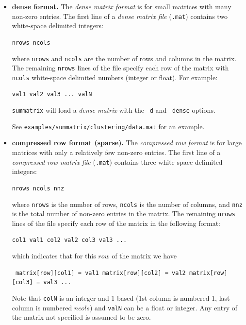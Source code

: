 \documentclass[12pt]{article}
\newcommand{\code}[1]{{\tt #1}}
\newcommand{\codeblock}[1]{\vspace{.1in} {\tt #1} \vspace{.1in}}
\begin{document}
\begin{itemize}

    \item {\bf dense format.}
    The {\em dense matrix format} is for small matrices with many non-zero entries.
    The first line of a {\em dense matrix file} (\code{*.mat})
    contains two white-space delimited integers:
    
    \codeblock{nrows ncols}
    
    where \code{nrows} and \code{ncols} are the number of rows and columns in
    the matrix.  The remaining \code{nrows} lines of
    the file specify each row of the matrix with \code{ncols} white-space
    delimited numbers (integer or float).  For example:

    \codeblock{val1 val2 val3 ... valN}

    \code{summatrix} will load a {\em dense matrix} with the \code{-d}
    and  \code{--dense} options.
    
    See \code{examples/summatrix/clustering/data.mat} for an example.
    
    
    \item {\bf compressed row format (sparse).}
    The {\em compressed row format} is for large matrices with only a
    relatively few non-zero entries.
    The first line of a {\em compressed row matrix file} (\code{*.mat})
    contains three white-space delimited integers:
    
    \codeblock{nrows ncols nnz}
    
    where \code{nrows} is the number of rows, \code{ncols} is the number of
    columns, and \code{nnz} is the total number of non-zero entries in the
    matrix.  The remaining \code{nrows} lines of the file specify each row of
    the matrix in the following format:

    \codeblock{col1 val1 col2 val2 col3 val3 ...}

    which indicates that for this $row$ of the matrix we have
    
    \codeblock{
        matrix[row][col1] = val1 \newline
        matrix[row][col2] = val2 \newline
        matrix[row][col3] = val3 \newline
        ... 
    }
    
    
    Note that \code{colN} is an integer and 1-based (1st column is
    numbered 1, last column is numbered $ncols$) and \code{valN} can be a 
    float or integer.  Any entry of the matrix not specified is assumed to be
    zero.


\end{itemize}
\end{document}

